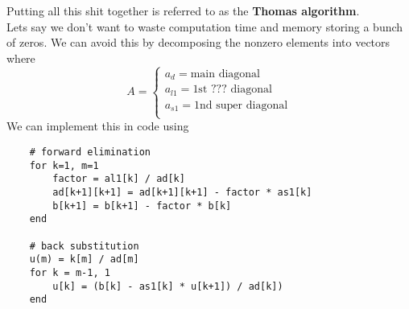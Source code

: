 \documentclass[10pt]{article}
\begin{document}
Putting all this shit together is referred to as the \textbf{Thomas algorithm}.\\

Lets say we don't want to waste computation time and memory storing a bunch of zeros. We can avoid this by decomposing the nonzero elements into vectors where
\[A = 
    \begin{cases}
        a_d = \text{main diagonal}\\
    a_{l1} = \text{1st ??? diagonal}\\
    a_{s1} = \text{1nd super diagonal}\\
    \end{cases}
\]
We can implement this in code using

\begin{verbatim}
    # forward elimination 
    for k=1, m=1
        factor = al1[k] / ad[k]
        ad[k+1][k+1] = ad[k+1][k+1] - factor * as1[k]
        b[k+1] = b[k+1] - factor * b[k]
    end

    # back substitution
    u(m) = k[m] / ad[m]
    for k = m-1, 1
        u[k] = (b[k] - as1[k] * u[k+1]) / ad[k])
    end
\end{verbatim}
\noindent \underline{\hspace{3in}}\\
\end{document}
